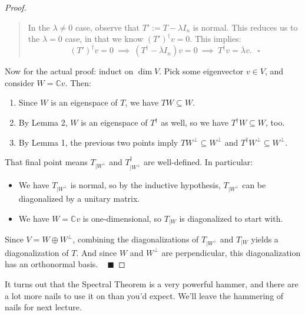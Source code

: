 \begin{proof}
\begin{quote}
        In the $\lambda \neq 0$ case, observe that $T' := T - \lambda I_n$ is normal.  This reduces us to the $\lambda = 0$ case, in that we know $(T')^{\dagger}v = 0$.  This implies:
        \[ (T')^{\dagger}v = 0 ~ \implies ~ (T^{\dagger} - \overline{\lambda}I_n)v = 0 ~ \implies ~ T^{\dagger}v = \overline{\lambda}v. ~~~ \square \] \vspace{-0.8cm}
    \end{quote}
    Now for the actual proof: induct on $\dim V$.  Pick some eigenvector $v \in V$, and consider $W = \mathbb{C}v$.  Then:
    \begin{enumerate}
        \item Since $W$ is an eigenspace of $T$, we have $TW \subseteq W$.
        \item By Lemma 2, $W$ is an eigenspace of $T^{\dagger}$ as well, so we have $T^{\dagger}W \subseteq W$, too.
        \item By Lemma 1, the previous two points imply $TW^{\perp} \subseteq W^{\perp}$ and $T^{\dagger}W^{\perp} \subseteq W^{\perp}$.
    \end{enumerate}
    That final point means $T_{|W^{\perp}}$ and $T_{|W^{\perp}}^{\dagger}$ are well-defined.  In particular:
    \begin{itemize}
        \item We have $T_{|W^{\perp}}$ is normal, so by the inductive hypothesis, $T_{|W^{\perp}}$ can be diagonalized by a unitary matrix.
        \item We have $W = \mathbb{C}v$ is one-dimensional, so $T_{|W}$ is diagonalized to start with.
    \end{itemize}
    Since $V = W \oplus W^{\perp}$, combining the diagonalizations of $T_{|W^{\perp}}$ and $T_{|W}$ yields a diagonalization of $T$.  And since $W$ and $W^{\perp}$ are perpendicular, this diagonalization has an orthonormal basis. ~ $\blacksquare$
\end{proof}

It turns out that the Spectral Theorem is a very powerful hammer, and there are a lot more nails to use it on than you'd expect.  We'll leave the hammering of nails for next lecture.

